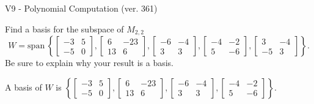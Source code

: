 \begin{exercise}
  \begin{exerciseTitle}V9 - Polynomial Computation (ver. 361)\end{exerciseTitle}
  \begin{exerciseStatement}
    Find a basis for the subspace of \(M_{2,2}\) 
\[W=\mathrm{span}\ \left\{\left[\begin{array}{cc}
-3 & 5 \\
-5 & 0
\end{array}\right] , \left[\begin{array}{cc}
6 & -23 \\
13 & 6
\end{array}\right] , \left[\begin{array}{cc}
-6 & -4 \\
3 & 3
\end{array}\right] , \left[\begin{array}{cc}
-4 & -2 \\
5 & -6
\end{array}\right] , \left[\begin{array}{cc}
3 & -4 \\
-5 & 3
\end{array}\right]\right\}.\]
 Be sure to explain why your result is a basis.


  \end{exerciseStatement}
  \begin{exerciseAnswer}
   A basis of \(W\) is  \(\left\{\left[\begin{array}{cc}
-3 & 5 \\
-5 & 0
\end{array}\right] , \left[\begin{array}{cc}
6 & -23 \\
13 & 6
\end{array}\right] , \left[\begin{array}{cc}
-6 & -4 \\
3 & 3
\end{array}\right] , \left[\begin{array}{cc}
-4 & -2 \\
5 & -6
\end{array}\right]\right\}\).
  


  \end{exerciseAnswer}
\end{exercise}